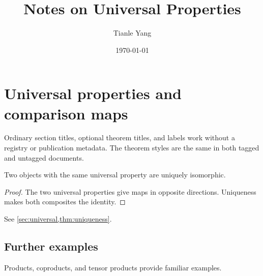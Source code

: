 \documentclass[sectionlevel=section,status=published]{noteformyself}
\title{Notes on Universal Properties}
\author{Tianle Yang}
\date{\today}
\begin{document}
\maketitle

\section[Universal properties]{Universal properties and comparison maps}
\label{sec:universal}

Ordinary section titles, optional theorem titles, and labels work without a
registry or publication metadata. The theorem styles are the same in both
tagged and untagged documents.

\begin{theorem}[Uniqueness]\label{thm:uniqueness}
  Two objects with the same universal property are uniquely isomorphic.
\end{theorem}

\begin{proof}
  The two universal properties give maps in opposite directions. Uniqueness
  makes both composites the identity.
\end{proof}

See \cref{sec:universal,thm:uniqueness}.

\subsection*{Further examples}
Products, coproducts, and tensor products provide familiar examples.
\end{document}
